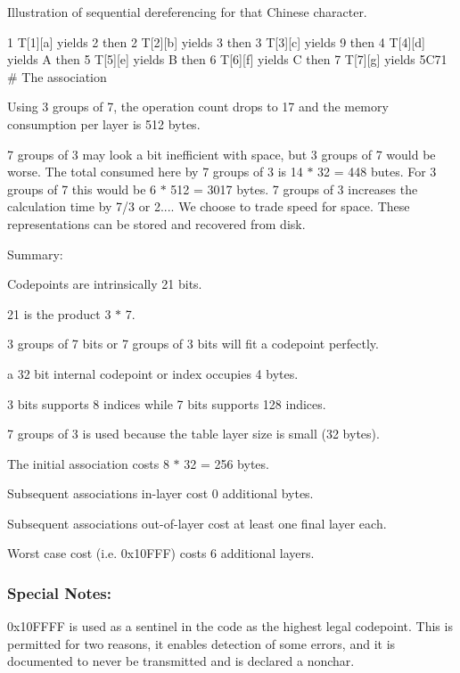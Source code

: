 Illustration of sequential dereferencing for that Chinese character. 
\begin{DoxyCode}
1 T[1][a] yields 2 then
2 T[2][b] yields 3 then
3 T[3][c] yields 9 then
4 T[4][d] yields A then
5 T[5][e] yields B then
6 T[6][f] yields C then
7 T[7][g] yields 5C71  # The association
\end{DoxyCode}


Using 3 groups of 7, the operation count drops to 17 and the memory consumption per layer is 512 bytes.

7 groups of 3 may look a bit inefficient with space, but 3 groups of 7 would be worse. The total consumed here by 7 groups of 3 is 14 $\ast$ 32 = 448 butes. For 3 groups of 7 this would be 6 $\ast$ 512 = 3017 bytes. 7 groups of 3 increases the calculation time by 7/3 or 2.... We choose to trade speed for space. These representations can be stored and recovered from disk.

Summary\+:
\begin{DoxyItemize}
\item Codepoints are intrinsically 21 bits.
\item 21 is the product 3 $\ast$ 7.
\item 3 groups of 7 bits or 7 groups of 3 bits will fit a codepoint perfectly.
\item a 32 bit internal codepoint or index occupies 4 bytes.
\item 3 bits supports 8 indices while 7 bits supports 128 indices.
\item 7 groups of 3 is used because the table layer size is small (32 bytes).
\item The initial association costs 8 $\ast$ 32 = 256 bytes.
\item Subsequent associations in-\/layer cost 0 additional bytes.
\item Subsequent associations out-\/of-\/layer cost at least one final layer each.
\item Worst case cost (i.\+e. 0x10\+F\+F\+F) costs 6 additional layers.
\end{DoxyItemize}

\subsubsection*{Special Notes\+:}

0x10\+F\+F\+F\+F is used as a sentinel in the code as the highest legal codepoint. This is permitted for two reasons, it enables detection of some errors, and it is documented to never be transmitted and is declared a nonchar.

